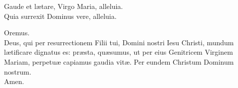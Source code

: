 \setlength{\parskip}{0.5em}
\V Gaude et lætare, Virgo Maria, alleluia.\\
\R Quia surrexit Dominus vere, alleluia.

Oremus.\\
Deus, qui per resurrectionem Filii tui, Domini nostri Iesu Christi,
mundum lætificare dignatus es:
præsta, quæsumus, ut per eius Genitricem Virginem Mariam,
perpetuæ capiamus gaudia vitæ.
Per eundem Christum Dominum nostrum.\\
\R Amen.
\setlength{\parskip}{0.5em}
